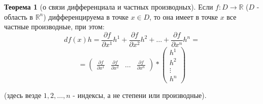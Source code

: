 \documentclass{report}
\theoremstyle{definition}
\newtheorem{theorem}{Теорема}[section]
\begin{document}
\begin{theorem}[о связи дифференциала и частных производных]
  Если $f:D\rightarrow\mathbb{R}$ ($D$ - область в $\mathbb{R}^n$) дифференцируема в точке $x \in D$, то она 
  имеет в точке $x$ все частные производные, при этом:
  \begin{equation*}
    df(x)h = \frac{\partial f}{\partial x^1}h^1 + \frac{\partial f}{\partial x^2}h^2 + \ldots +
    \frac{\partial f}{\partial x^n}h^n =
  \end{equation*}
  \begin{equation*}
    =\left(\begin{array}{cccc}
      \frac{\partial f}{\partial x^1} & \frac{\partial f}{\partial x^2} & \ldots & \frac{\partial f}{\partial x^n} 
    \end{array}\right) * \left(\begin{array}{c}
      h^1 \\
      h^2 \\
      \vdots \\
      h^n
    \end{array}\right)
  \end{equation*}

  (здесь везде $1,2,\ldots,n$ - индексы, а не степени или производные).
\end{theorem}
\end{document}
